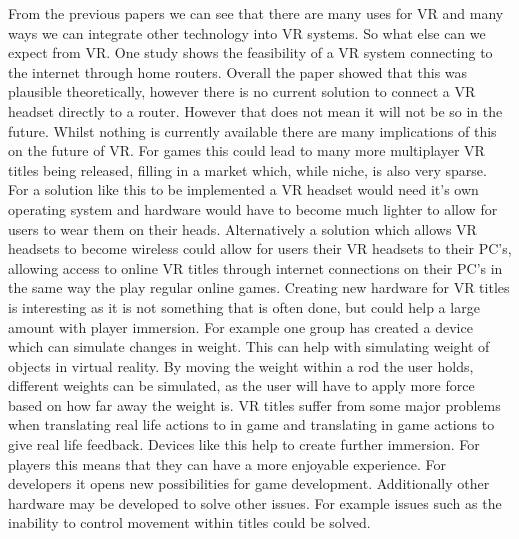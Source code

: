 \documentclass{scrartcl}
\begin{document}
From the previous papers we can see that there are many uses for VR and many ways we can integrate other technology into VR systems. So what else can we expect from VR. One study shows the feasibility of a VR system connecting to the internet through home routers\cite{WirelessVR}. Overall the paper showed that this was plausible theoretically, however there is no current solution to connect a VR headset directly to a router. However that does not mean it will not be so in the future.  
Whilst nothing is currently available there are many implications of this on the future of VR. For games this could lead to many more multiplayer VR titles being released, filling in a market which, while niche, is also very sparse. For a solution like this to be implemented a VR headset would need it's own operating system and hardware would have to become much lighter to allow for users to wear them on their heads. Alternatively a solution which allows VR headsets to become wireless could allow for users their VR headsets to their PC's, allowing access to online VR titles through internet connections on their PC's in the same way the play regular online games.  
Creating new hardware for VR titles is interesting as it is not something that is often done, but could help a large amount with player immersion. For example one group has created a device which can simulate changes in weight\cite{zenner2017shifty}. This can help with simulating weight of objects in virtual reality. By moving the weight within a rod the user holds, different weights can be simulated, as the user will have to apply more force based on how far away the weight is.  
VR titles suffer from some major problems when translating real life actions to in game and translating in game actions to give real life feedback. Devices like this help to create further immersion. For players this means that they can have a more enjoyable experience. For developers it opens new possibilities for game development. Additionally other hardware may be developed to solve other issues. For example issues such as the inability to control movement within titles could be solved. 


\end{document}
